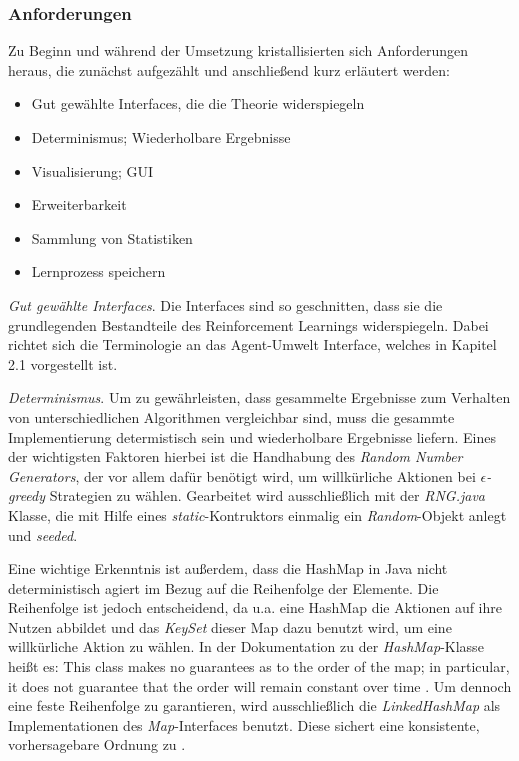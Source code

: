 

\subsubsection{Anforderungen}
Zu Beginn und während der Umsetzung kristallisierten sich Anforderungen heraus, die zunächst aufgezählt und anschließend kurz erläutert werden:

\begin{itemize}
    \item Gut gewählte Interfaces, die die Theorie widerspiegeln
    \item Determinismus; Wiederholbare Ergebnisse
    \item Visualisierung; GUI
    \item Erweiterbarkeit
    \item Sammlung von Statistiken
    \item Lernprozess speichern
\end{itemize}

\textit{Gut gewählte Interfaces}. Die Interfaces sind so geschnitten, dass sie die grundlegenden Bestandteile des Reinforcement Learnings widerspiegeln. Dabei richtet sich die Terminologie an das Agent-Umwelt Interface, welches in Kapitel 2.1 vorgestellt ist. 
\par 
\textit{Determinismus}. Um zu gewährleisten, dass gesammelte Ergebnisse zum Verhalten von unterschiedlichen Algorithmen vergleichbar sind, muss die gesammte Implementierung determistisch sein und wiederholbare Ergebnisse liefern. Eines der wichtigsten Faktoren hierbei ist die Handhabung des \textit{Random Number Generators}, der vor allem dafür benötigt wird, um \glqq willkürliche\grqq{} Aktionen bei $\epsilon$\textit{-greedy} Strategien zu wählen. Gearbeitet wird ausschließlich mit der \textit{RNG.java} Klasse, die mit Hilfe eines \textit{static}-Kontruktors einmalig ein \textit{Random}-Objekt anlegt und \textit{seeded}.
\par 
Eine wichtige Erkenntnis ist außerdem, dass die HashMap in Java nicht deterministisch agiert im Bezug auf die Reihenfolge der Elemente. Die Reihenfolge ist jedoch entscheidend, da u.a. eine HashMap die Aktionen auf ihre Nutzen abbildet und das \textit{KeySet} dieser Map dazu benutzt wird, um eine willkürliche Aktion zu wählen. In der Dokumentation zu der \textit{HashMap}-Klasse heißt es: \glqq This class makes no guarantees as to the order of the map; in particular, it does not guarantee that the order will remain constant over time \grqq{}\cite{hashmap}.
Um dennoch eine feste Reihenfolge zu garantieren, wird ausschließlich die \textit{LinkedHashMap} als Implementationen des \textit{Map}-Interfaces benutzt. Diese sichert eine konsistente, vorhersagebare Ordnung zu \cite[]{linkedHashMap}.

